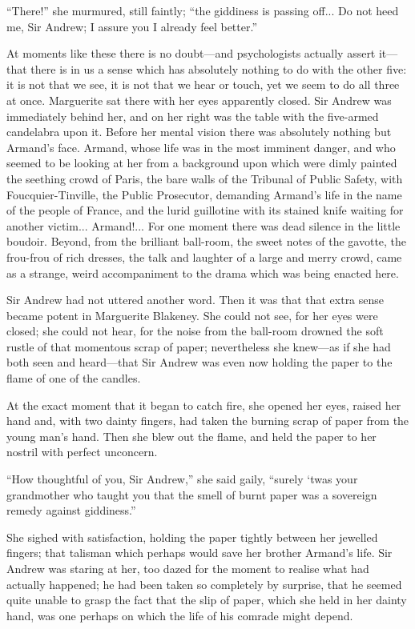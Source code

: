 \enquote{There!} she murmured, still faintly; \enquote{the giddiness is passing off... Do not heed me, Sir Andrew; I assure you I already feel better.}

At moments like these there is no doubt---and psychologists actually assert it---that there is in us a sense which has absolutely nothing to do with the other five: it is not that we see, it is not that we hear or touch, yet we seem to do all three at once. Marguerite sat there with her eyes apparently closed. Sir Andrew was immediately behind her, and on her right was the table with the five-armed candelabra upon it. Before her mental vision there was absolutely nothing but Armand's face. Armand, whose life was in the most imminent danger, and who seemed to be looking at her from a background upon which were dimly painted the seething crowd of Paris, the bare walls of the Tribunal of Public Safety, with Foucquier-Tinville, the Public Prosecutor, demanding Armand's life in the name of the people of France, and the lurid guillotine with its stained knife waiting for another victim... Armand!... For one moment there was dead silence in the little boudoir. Beyond, from the brilliant ball-room, the sweet notes of the gavotte, the frou-frou of rich dresses, the talk and laughter of a large and merry crowd, came as a strange, weird accompaniment to the drama which was being enacted here.

Sir Andrew had not uttered another word. Then it was that that extra sense became potent in Marguerite Blakeney. She could not see, for her eyes were closed; she could not hear, for the noise from the ball-room drowned the soft rustle of that momentous scrap of paper; nevertheless she knew---as if she had both seen and heard---that Sir Andrew was even now holding the paper to the flame of one of the candles.

At the exact moment that it began to catch fire, she opened her eyes, raised her hand and, with two dainty fingers, had taken the burning scrap of paper from the young man's hand. Then she blew out the flame, and held the paper to her nostril with perfect unconcern.

\enquote{How thoughtful of you, Sir Andrew,} she said gaily, \enquote{surely `twas your grandmother who taught you that the smell of burnt paper was a sovereign remedy against giddiness.}

She sighed with satisfaction, holding the paper tightly between her jewelled fingers; that talisman which perhaps would save her brother Armand's life. Sir Andrew was staring at her, too dazed for the moment to realise what had actually happened; he had been taken so completely by surprise, that he seemed quite unable to grasp the fact that the slip of paper, which she held in her dainty hand, was one perhaps on which the life of his comrade might depend.

